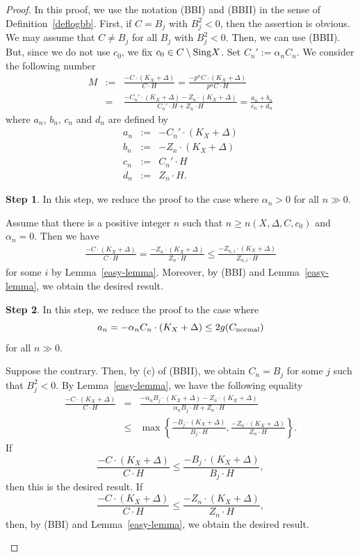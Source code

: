 \documentclass[12pt,twoside]{amsart}
\theoremstyle{definition}
\newtheorem{step}{Step}
\begin{document}
\begin{proof}
In this proof, we use the notation (BBI) and (BBII) in the sense of Definition~\ref{deflogbb}. 
First, if $C=B_j$ with $B_j^2<0$, 
then the assertion is obvious. 
We may assume that $C\neq B_j$ for all $B_j$ with $B_j^2<0$. 
Then, we can use (BBII). 
But, since we do not use $c_0$, we fix $c_0\in C\setminus {\rm Sing} X$. 
Set $C_n':=\alpha_nC_n$. 
We consider the following number 
\begin{eqnarray*}
M&:=&\frac{-C\cdot (K_X+\Delta)}{C\cdot H}=\frac{-p^nC\cdot (K_X+\Delta)}{p^nC\cdot H}\\
&=&\frac{-C_n'\cdot (K_X+\Delta)-Z_n\cdot (K_X+\Delta)}{C_n'\cdot H+Z_n\cdot H}
=\frac{a_n+b_n}{c_n+d_n}
\end{eqnarray*}
where $a_n$, $b_n$, $c_n$ and $d_n$ are defined by 
\begin{eqnarray*}
a_n&:=&-C_n'\cdot (K_X+\Delta)\\
b_n&:=&-Z_n\cdot (K_X+\Delta)\\
c_n&:=&C_n'\cdot H\\
d_n&:=&Z_n\cdot H.
\end{eqnarray*}

\setcounter{step}{0}

\begin{step}
In this step, we reduce the proof to the case where $\alpha_n>0$ for all $n \gg 0$. 

Assume that there is a positive integer $n$ such that 
$n\geq n(X, \Delta, C, c_0)$ and $\alpha_n=0$. 
Then we have 
\begin{eqnarray*}
\frac{-C\cdot (K_X+\Delta)}{C\cdot H}=\frac{-Z_n\cdot (K_X+\Delta)}{Z_n\cdot H}
\leq \frac{-Z_{n,i}\cdot (K_X+\Delta)}{Z_{n,i}\cdot H}
\end{eqnarray*}
for some $i$ by Lemma~\ref{easy-lemma}. 
Moreover, by (BBI) and Lemma~\ref{easy-lemma}, we obtain the desired result. 
\end{step}


\begin{step}
In this step, we reduce the proof to the case where 
$$a_n=-\alpha_nC_n\cdot (K_X+\Delta)\leq 2g(C_{\rm normal})$$ 
for all $n \gg 0$. 

Suppose the contrary. Then, by (c) of (BBII), we obtain $C_n=B_j$ for some $j$ such that $B_j^2<0$. 
By Lemma~\ref{easy-lemma}, we have the following equality 
\begin{eqnarray*}
\frac{-C\cdot (K_X+\Delta)}{C\cdot H}&=&
\frac{-\alpha_nB_j\cdot (K_X+\Delta)-Z_n\cdot (K_X+\Delta)}
{\alpha_nB_j\cdot H+Z_n\cdot H}\\
&\leq&\max\left\{ \frac{-B_j\cdot (K_X+\Delta)}{B_j\cdot H}, 
\frac{-Z_n\cdot (K_X+\Delta)}{Z_n\cdot H}\right\}.\end{eqnarray*}
If 
$$\frac{-C\cdot (K_X+\Delta)}{C\cdot H} \leq
\frac{-B_j\cdot (K_X+\Delta)}{B_j\cdot H},$$
then this is the desired result. 
If 
$$\frac{-C\cdot (K_X+\Delta)}{C\cdot H} 
\leq \frac{-Z_n\cdot (K_X+\Delta)}{Z_n\cdot H}, $$
then, by (BBI) and Lemma~\ref{easy-lemma}, we obtain the desired result. 
\end{step}


\end{proof}
\end{document}
